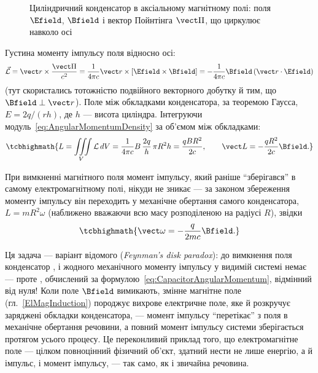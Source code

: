 \begin{figure}[h!]\centering
	\caption{Циліндричний конденсатор в аксіальному магнітному полі: поля $\Efield$, $\Bfield$ і
		вектор Пойнтінга $\vect\Pi$, що циркулює навколо осі\label{pic:CapacitorAngularMomentum}}
\end{figure}

Густина моменту імпульсу поля відносно осі:
\begin{equation}\label{eq:AngularMomentumDensity}
	\vec{\mathcal L} = \vect r\times\frac{\vect\Pi}{c^2} = \frac1{4\pi c}\vect r\times\left[\Efield\times\Bfield\right] = -\frac1{4\pi
	c}\Bfield\left(\vect r\cdot\Efield\right)
\end{equation}
(тут скористались тотожністю подвійного векторного добутку й тим, що $\Bfield\perp\vect r$). Поле між обкладками конденсатора, за теоремою
Гаусса, $E = 2q/(rh)$, де $h$ --- висота циліндра. Інтегруючи модуль~\eqref{eq:AngularMomentumDensity} за об'ємом між обкладками:
\begin{equation}\label{eq:CapacitorAngularMomentum}
	\tcbhighmath{
		L = \iiint\limits_V \mathcal L\, dV = \frac1{4\pi c}B\,\frac{2q}h\,\pi R^2 h = \frac{qBR^2}{2c}, \qquad \vect L = -\frac{qR^2}{2c}\Bfield.
	}
\end{equation}

При вимкненні магнітного поля момент імпульсу, який раніше \enquote{зберігався} в самому електромагнітному полі, нікуди не зникає --- за законом
збереження моменту імпульсу він переходить у механічне обертання самого конденсатора, $L = mR^2\omega$ (наближено вважаючи всю масу
розподіленою на радіусі $R$), звідки
\begin{equation}\label{eq:CapacitorOmega}
	\tcbhighmath{
		\vect\omega = -\frac{q}{2mc}\Bfield.
	}
\end{equation}

\begin{Attention}
	Ця задача --- варіант відомого  (\emph{Feynman's disk paradox}): до вимкнення поля конденсатор , і
	жодного механічного моменту імпульсу у видимій системі немає --- проте , обчислений за
	формулою~\eqref{eq:CapacitorAngularMomentum}, відмінний від нуля! Коли поле $\Bfield$ вимикають, змінне магнітне поле (гл.~\ref{ElMagInduction})
	породжує вихрове електричне поле, яке й розкручує заряджені обкладки конденсатора, --- момент імпульсу \enquote{перетікає} з поля в
	механічне обертання речовини, а повний момент імпульсу системи  зберігається протягом усього процесу. Це переконливий
	приклад того, що електромагнітне поле --- цілком повноцінний фізичний об'єкт, здатний нести не лише енергію, а й імпульс, і момент імпульсу,
	--- так само, як і звичайна речовина.
\end{Attention}

